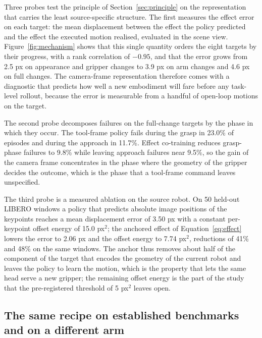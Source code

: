 Three probes test the principle of Section~\ref{sec:principle} on the representation that carries the least source-specific structure. The first measures the effect error on each target: the mean displacement between the effect the policy predicted and the effect the executed motion realised, evaluated in the scene view. Figure~\ref{fig:mechanism} shows that this single quantity orders the eight targets by their progress, with a rank correlation of $-0.95$, and that the error grows from 2.5 px on appearance and gripper changes to 3.9 px on arm changes and 4.6 px on full changes. The camera-frame representation therefore comes with a diagnostic that predicts how well a new embodiment will fare before any task-level rollout, because the error is measurable from a handful of open-loop motions on the target.

The second probe decomposes failures on the full-change targets by the phase in which they occur. The tool-frame policy fails during the grasp in 23.0\% of episodes and during the approach in 11.7\%. Effect co-training reduces grasp-phase failures to 9.8\% while leaving approach failures near 9.5\%, so the gain of the camera frame concentrates in the phase where the geometry of the gripper decides the outcome, which is the phase that a tool-frame command leaves unspecified.

The third probe is a measured ablation on the source robot. On 50 held-out LIBERO windows a policy that predicts absolute image positions of the keypoints reaches a mean displacement error of 3.50 px with a constant per-keypoint offset energy of 15.0 px$^2$; the anchored effect of Equation~\eqref{eq:effect} lowers the error to 2.06 px and the offset energy to 7.74 px$^2$, reductions of 41\% and 48\% on the same windows. The anchor thus removes about half of the component of the target that encodes the geometry of the current robot and leaves the policy to learn the motion, which is the property that lets the same head serve a new gripper; the remaining offset energy is the part of the study that the pre-registered threshold of 5 px$^2$ leaves open.

\subsection{The same recipe on established benchmarks and on a different arm}
\label{sec:exp-external}

